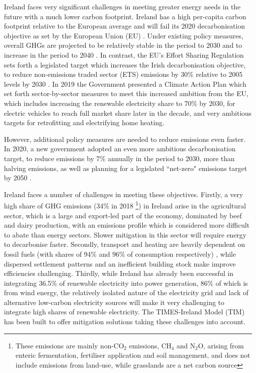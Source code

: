 \documentclass[gmd,manuscript]{copernicus}
\begin{document}
\introduction   %
Ireland faces very significant challenges in meeting greater energy needs in the future with a much lower carbon footprint. Ireland has a high per-capita carbon footprint relative to the European average and will fail its 2020 decarbonisation objective as set by the European Union (EU) \citep{DCCAE2019}. Under existing policy measures, overall GHGs are projected to be relatively stable in the period to 2030 and to increase in the period to 2040 \citep{EPA}. In contrast, the EU's Effort Sharing Regulation sets forth a legislated target which increases the Irish decarbonisation objective, to reduce non-emissions traded sector (ETS) emissions by 30\% relative to 2005 levels by 2030 \citep{CCAC2020}. In 2019 the Government presented a Climate Action Plan which set forth sector-by-sector measures to meet this increased ambition from the EU, which includes increasing the renewable electricity share to 70\% by 2030, for electric vehicles to reach full market share later in the decade, and very ambitious targets for retrofitting and electrifying home heating. 
 
However, additional policy measures are needed to reduce emissions even faster. In 2020, a new government adopted an even more ambitious decarbonisation target, to reduce emissions by 7\% annually in the period to 2030, more than halving emissions, as well as planning for a legislated ``net-zero" emissions target by 2050 \citep{DepartmentoftheTaoiseach2020}. 
 
Ireland faces a number of challenges in meeting these objectives. Firstly, a very high share of GHG emissions (34\% in 2018 \citep{EPA2019}\footnote{These emissions are mainly non-CO$_2$ emissions, CH$_4$ and N$_2$O, arising from enteric fermentation, fertiliser application and soil management, and does not include emissions from land-use, while grasslands are a net carbon source}) in Ireland arise in the agricultural sector, which is a large and export-led part of the economy, dominated by beef and dairy production, with an emissions profile which is considered more difficult to abate than energy sectors. Slower mitigation in this sector will require energy to decarbonise faster. Secondly, transport and heating are heavily dependent on fossil fuels (with shares of 94\% and 96\% of consumption respectively) \citep{SEAI2019}, while dispersed settlement patterns and an inefficient building stock make improve efficiencies challenging. Thirdly, while Ireland has already been successful in integrating 36.5\% of renewable electricity into power generation, 86\% of which is from wind energy, the relatively isolated nature of the electricity grid and lack of alternative low-carbon electricity sources will make it very challenging to integrate high shares of renewable electricity. The TIMES-Ireland Model (TIM) has been built to offer mitigation solutions taking these challenges into account.
\end{document}
